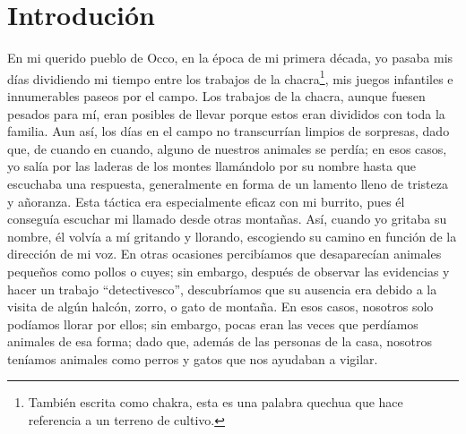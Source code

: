 \cleardoublepage
\newpage
\ifdefined\EnableIncludeImages
\fi
\chapter*{Introdución} %

En mi querido pueblo de Occo, en la época de mi primera década, yo pasaba mis días dividiendo mi tiempo entre los trabajos de la chacra\footnote{También escrita como chakra, esta es una palabra quechua que hace referencia a un terreno de cultivo.}, mis juegos infantiles e innumerables paseos por el campo.
Los trabajos de la chacra, aunque fuesen pesados para mí, eran posibles de llevar porque estos eran divididos con toda la familia. 
Aun así, los días en el campo no transcurrían limpios de sorpresas, dado que, de cuando en cuando, alguno de nuestros animales se perdía; en esos casos, yo salía por las laderas de los montes llamándolo por su nombre hasta que escuchaba una respuesta, generalmente en forma de un lamento lleno de tristeza y añoranza.
Esta táctica era especialmente eficaz con mi burrito, pues él conseguía escuchar mi llamado desde otras montañas. Así, cuando yo gritaba su nombre, él volvía a mí gritando y llorando, escogiendo su camino en función de la dirección de mi voz.  
En otras ocasiones percibíamos que desaparecían animales pequeños como pollos o cuyes; sin embargo, después de observar las evidencias y hacer un trabajo ``detectivesco'', descubríamos que su ausencia era debido a la visita de algún halcón, zorro, o gato de montaña.
En esos casos, nosotros solo podíamos llorar por ellos; sin embargo, pocas eran las veces que perdíamos animales de esa forma; dado que, además de las personas de la casa, nosotros teníamos animales como perros y gatos que nos ayudaban a vigilar.

